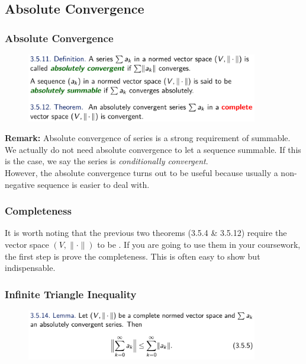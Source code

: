\documentclass[10pt, t]{beamer}
\renewcommand{\emph}[1]{{\color{themecolor}\textsl{#1}}}
\newcommand{\alarm}[1]{{\color{bladerunnerred}{#1}}}
\newcommand{\nullspace}{~\\[15pt]}
\begin{document}
\subsection{Absolute Convergence}
\begin{frame}
    \frametitle{Absolute Convergence}

    \begin{figure}[H]
        \centering
        \includegraphics[width=0.9\textwidth]{2020-11-11-13-47-24.png}
    \end{figure}
    \textbf{Remark:} Absolute convergence of series is a strong requirement of summable. We actually do not need absolute convergence to let a sequence summable. If this is the case, we say the series is \emph{conditionally convergent}.\nullspace However, the absolute convergence turns out to be useful because usually a non-negative sequence is easier to deal with.
\end{frame}

\begin{frame}
    \frametitle{Completeness}

    It is worth noting that the previous two theorems (3.5.4 \& 3.5.12) require the vector space $(V,\|\cdot\|)$ to be \alarm{complete}. If you are going to use them in your coursework, the first step is prove the completeness. This is often easy to show but indispensable.

\end{frame}

\begin{frame}
    \frametitle{Infinite Triangle Inequality}

    \begin{figure}[H]
        \centering
        \includegraphics[width=0.9\textwidth]{2020-11-11-14-41-55.png}
    \end{figure}
    
\end{frame}
\end{document}
